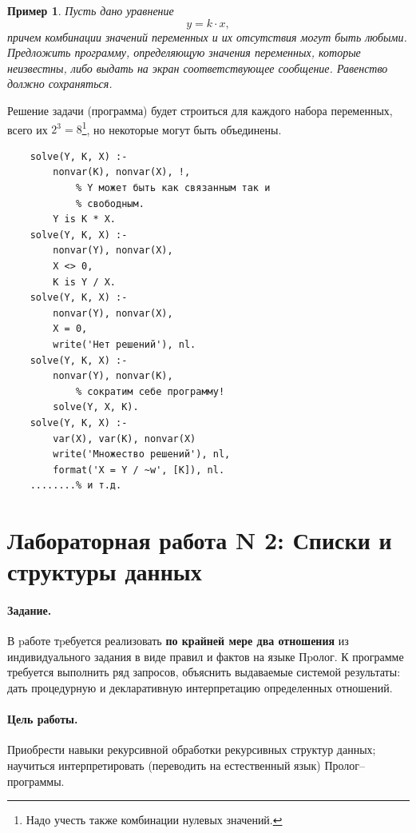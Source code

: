 \documentclass[12pt, openany, twoside]{book} %
\newtheorem{example}{Пример}[chapter]
\begin{document}
\begin{example}  Пусть дано уравнение
$$
    y=k\cdot x,
$$
причем комбинации значений переменных и их отсутствия могут быть любыми. Предложить программу, определяющую значения переменных, которые неизвестны,  либо выдать на экран соответствующее сообщение. Равенство должно сохраняться.
\end{example}

Решение задачи (программа) будет строиться для каждого набора переменных, всего их $2^3=8$\footnote{Надо учесть также комбинации нулевых значений.}, но некоторые могут быть объединены.

{\tt \begin{verbatim}
    solve(Y, K, X) :-
        nonvar(K), nonvar(X), !,
            % Y может быть как связанным так и
            % свободным.
        Y is K * X.
    solve(Y, K, X) :-
        nonvar(Y), nonvar(X),
        X <> 0,
        K is Y / X.
    solve(Y, K, X) :-
        nonvar(Y), nonvar(X),
        X = 0,
        write('Нет решений'), nl.
    solve(Y, K, X) :-
        nonvar(Y), nonvar(K),
            % сократим себе программу!
        solve(Y, X, K).
    solve(Y, K, X) :-
        var(X), var(K), nonvar(X)
        write('Множество решений'), nl,
        format('X = Y / ~w', [K]), nl.
    ........% и т.д.
\end{verbatim}}


\section{Лабораторная работа N 2: Списки и структуры данных}

\paragraph{Задание.} В pаботе тpебуется реализовать {\bf по крайней мере два отношения} из индивидуального задания в виде правил и фактов на языке Пpолог. К программе требуется выполнить ряд запросов, объяснить выдаваемые системой результаты: дать процедурную и декларативную интерпретацию определенных отношений.

\paragraph{Цель работы.} Приобрести навыки рекурсивной обработки рекурсивных структур данных; научиться интерпретировать (переводить на естественный язык) Пролог--программы.
\end{document}
